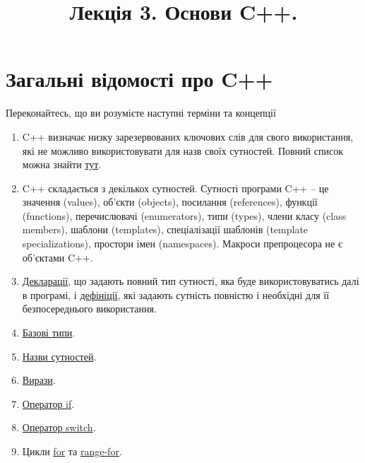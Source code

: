 \documentclass[12pt]{article}
\title{Лекція 3. Основи C++.}
\begin{document}
	\maketitle

	\tableofcontents
	
	\section{Загальні відомості про C++}
	Переконайтесь, що ви розумієте наступні терміни та концепції
	\begin{enumerate}
		\item C++ визначає низку зарезервованих ключових слів для свого використання, які не можливо використовувати для назв своїх сутностей. Повний список можна знайти \href{https://en.cppreference.com/w/cpp/keyword}{тут}.
		\item C++ складається з декількох сутностей. Сутності програми C++ -- це значення (values), об'єкти (objects), посилання (references), функції (functions), перечислювачі (enumerators), типи (types), члени класу (class members), шаблони (templates), спеціалізації шаблонів (template specializations), простори імен (namespaces). Макроси препроцесора не є об'єктами C++.
		\item \href{https://en.cppreference.com/w/cpp/language/declarations}{Декларації}, що задають повний тип сутності, яка буде використовуватись далі в програмі, і \href{https://en.cppreference.com/w/cpp/language/definition}{дефініції}, які задають сутність повністю і необхідні для її безпосереднього використання.
		\item \href{https://en.cppreference.com/w/cpp/language/types}{Базові типи}.
		\item \href{https://en.cppreference.com/w/cpp/language/identifiers}{Назви сутностей}.
		\item \href{https://en.cppreference.com/w/cpp/language/expressions}{Вирази}.
		\item \href{https://en.cppreference.com/w/cpp/language/if}{Оператор if}.
		\item \href{https://en.cppreference.com/w/cpp/language/switch}{Оператор switch}.
		\item Цикли \href{https://en.cppreference.com/w/cpp/language/for}{for} та \href{https://en.cppreference.com/w/cpp/language/range-for}{range-for}.

\end{enumerate}
\end{document}
